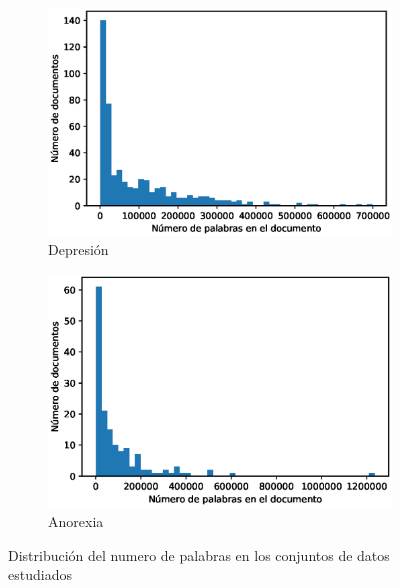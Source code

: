 
\begin{figure}[!ht]
    
    \begin{subfigure}[b]{0.5\textwidth}
        \includegraphics[width=\textwidth]{sections/figures/length_dist.eps}
        \caption{Depresión}
    \end{subfigure}
    \hfill
    \begin{subfigure}[b]{0.5\textwidth}
        \includegraphics[width=\textwidth]{sections/figures/length_dist_anorexia.eps}
        \caption{Anorexia}
    \end{subfigure}
    \caption{Distribución del numero de palabras en los conjuntos de datos estudiados}
    \label{fig:erisk_freq}
\end{figure}

